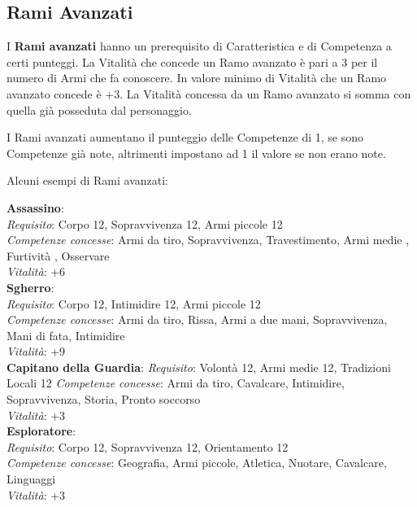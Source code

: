 \documentclass[12pt,a4paper,twoside,openany]{book}
\begin{document}
\begin{multicols}{2}	

\subsection{Rami Avanzati}

I \textbf{Rami avanzati} hanno un prerequisito di Caratteristica e di Competenza a certi punteggi.
La Vitalità che concede un Ramo avanzato è pari a 3 per il numero di Armi che fa conoscere. In valore minimo di Vitalità che un Ramo avanzato concede è +3.
La Vitalità concessa da un Ramo avanzato si somma con quella già posseduta dal personaggio.

I Rami avanzati aumentano il punteggio delle Competenze di 1, se sono Competenze già note, altrimenti impostano ad 1 il valore se non erano note.

Alcuni esempi di Rami avanzati:\medskip

\textbf{Assassino}:\\
\textit{Requisito}: Corpo 12, Sopravvivenza 12, Armi piccole 12\\
\textit{Competenze concesse}: Armi da tiro, Sopravvivenza, Travestimento, Armi medie , Furtività , Osservare\\
\textit{Vitalità}: +6\\

\textbf{Sgherro}:\\
\textit{Requisito}: Corpo 12, Intimidire 12, Armi piccole 12\\
\textit{Competenze concesse}: Armi da tiro, Rissa, Armi a due mani, Sopravvivenza, Mani di fata, Intimidire\\
\textit{Vitalità}: +9\\

\textbf{Capitano della Guardia}:
\textit{Requisito}: Volontà 12, Armi medie 12, Tradizioni Locali 12
\textit{Competenze concesse}: Armi da tiro, Cavalcare, Intimidire, Sopravvivenza, Storia, Pronto soccorso\\
\textit{Vitalità}: +3\\

\textbf{Esploratore}:\\
\textit{Requisito}: Corpo 12, Sopravvivenza 12, Orientamento 12\\
\textit{Competenze concesse}: Geografia, Armi piccole, Atletica, Nuotare, Cavalcare, Linguaggi\\
\textit{Vitalità}: +3\\


\end{multicols}
\end{document}
